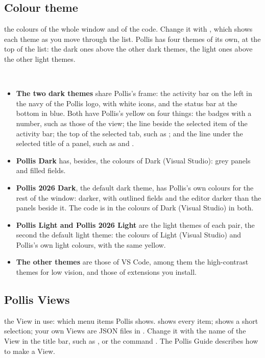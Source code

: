 \subsection{Colour theme}
\begin{itemize}
    the colours of the whole window and of the code. Change it with , which shows
    each theme as you move through the list. Pollis has four themes of its own, at the top of the list: the dark ones
    above the other dark themes, the light ones above the other light themes.
\end{itemize}
\begin{center}
\\[8pt]
\end{center}
\begin{itemize}
  \item \textbf{The two dark themes} share Pollis's frame: the activity bar on the left in the navy of the Pollis logo,
    with white icons, and the status bar at the bottom in blue. Both have Pollis's yellow on four things: the badges
    with a number, such as those of the  view; the line beside the selected item of the activity bar;
    the top of the selected tab, such as ; and the line under the selected title of a panel, such
    as  and .
  \item \textbf{Pollis Dark} has, besides, the colours of Dark (Visual Studio): grey panels and filled fields.
  \item \textbf{Pollis 2026 Dark}, the default dark theme, has Pollis's own colours for the rest of the window: darker,
    with outlined fields and the editor darker than the panels beside it. The code is in the colours of Dark (Visual
    Studio) in both.
  \item \textbf{Pollis Light and Pollis 2026 Light} are the light themes of each pair, the second the default light
    theme: the colours of Light (Visual Studio) and Pollis's own light colours, with the same yellow.
  \item \textbf{The other themes} are those of VS Code, among them the high-contrast themes for low vision, and those
    of extensions you install.
\end{itemize}

\subsection{Pollis Views}
\begin{itemize}
    the View in use: which menu items Pollis shows.  shows every item;  shows a short selection; your
    own Views are JSON files in . Change it with the name of the View in the title bar, such as
    , or the command . The Pollis Guide describes how to make a View.
\end{itemize}

